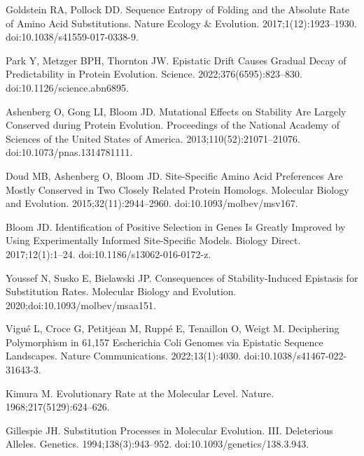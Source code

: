 \documentclass[10pt,letterpaper]{article}
\begin{document}
\begin{thebibliography}{10}
Goldstein RA, Pollock DD.
\newblock Sequence Entropy of Folding and the Absolute Rate of Amino Acid
Substitutions.
\newblock Nature Ecology \& Evolution. 2017;1(12):1923--1930.
\newblock doi:{10.1038/s41559-017-0338-9}.

Park Y, Metzger BPH, Thornton JW.
\newblock Epistatic Drift Causes Gradual Decay of Predictability in Protein
Evolution.
\newblock Science. 2022;376(6595):823--830.
\newblock doi:{10.1126/science.abn6895}.

Ashenberg O, Gong LI, Bloom JD.
\newblock Mutational Effects on Stability Are Largely Conserved during Protein
Evolution.
\newblock Proceedings of the National Academy of Sciences of the United States
of America. 2013;110(52):21071--21076.
\newblock doi:{10.1073/pnas.1314781111}.

Doud MB, Ashenberg O, Bloom JD.
\newblock Site-{{Specific Amino Acid Preferences Are Mostly Conserved}} in
{{Two Closely Related Protein Homologs}}.
\newblock Molecular Biology and Evolution. 2015;32(11):2944--2960.
\newblock doi:{10.1093/molbev/msv167}.

Bloom JD.
\newblock Identification of Positive Selection in Genes Is Greatly Improved by
Using Experimentally Informed Site-Specific Models.
\newblock Biology Direct. 2017;12(1):1--24.
\newblock doi:{10.1186/s13062-016-0172-z}.

Youssef N, Susko E, Bielawski JP.
\newblock Consequences of Stability-Induced Epistasis for Substitution Rates.
\newblock Molecular Biology and Evolution. 2020;doi:{10.1093/molbev/msaa151}.

Vigu{\'e} L, Croce G, Petitjean M, Rupp{\'e} E, Tenaillon O, Weigt M.
\newblock Deciphering Polymorphism in 61,157 {{Escherichia}} Coli Genomes via
Epistatic Sequence Landscapes.
\newblock Nature Communications. 2022;13(1):4030.
\newblock doi:{10.1038/s41467-022-31643-3}.

Kimura M.
\newblock Evolutionary Rate at the Molecular Level.
\newblock Nature. 1968;217(5129):624--626.

Gillespie JH.
\newblock Substitution Processes in Molecular Evolution. {{III}}.
{{Deleterious}} Alleles.
\newblock Genetics. 1994;138(3):943--952.
\newblock doi:{10.1093/genetics/138.3.943}.


\end{thebibliography}
\end{document}
